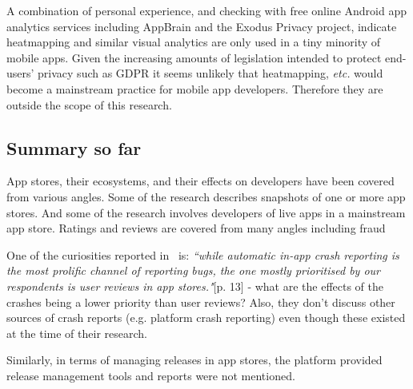 A combination of personal experience, and checking with free online Android app analytics services including AppBrain and the Exodus Privacy project, indicate heatmapping and similar visual analytics are only used in a tiny minority of mobile apps. Given the increasing amounts of legislation intended to protect end-users' privacy such as GDPR it seems unlikely that heatmapping, \textit{etc.} would become a mainstream practice for mobile app developers. Therefore they are outside the scope of this research.




\subsection{Summary so far} %
App stores, their ecosystems, and their effects on developers have been covered from various angles. Some of the research describes snapshots of one or more app stores. And some of the research involves developers of live apps in a mainstream app store. Ratings and reviews are covered from many angles including fraud~\citep{xie2015_appwatcher_unveiling_the_underground_market_of_trading_mobile_app_review}

One of the curiosities reported in~\citet{alsubaihin2019app_store_effects_on_software_engineering} is: \emph{``while automatic in-app crash reporting is the most prolific channel of reporting bugs, the one mostly prioritised by our respondents is user reviews in app stores."}[p. 13] - what are the effects of the crashes being a lower priority than user reviews? Also, they don't discuss other sources of crash reports (e.g. platform crash reporting) even though these existed at the time of their research.

Similarly, in terms of managing releases in app stores, the platform provided release management tools and reports were not mentioned. 


